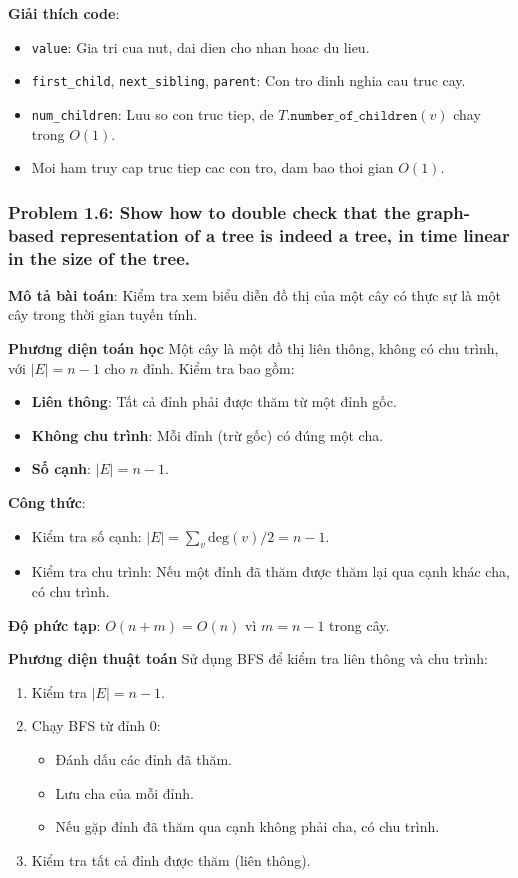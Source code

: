 \documentclass[a4paper,12pt]{article}
\begin{document}
\bigskip
\textbf{Giải thích code}:
\begin{itemize}
    \item \texttt{value}: Gia tri cua nut, dai dien cho nhan hoac du lieu.
    \item \texttt{first\_child}, \texttt{next\_sibling}, \texttt{parent}: Con tro dinh nghia cau truc cay.
    \item \texttt{num\_children}: Luu so con truc tiep, de \(T.\texttt{number\_of\_children}(v)\) chay trong \(O(1)\).
    \item Moi ham truy cap truc tiep cac con tro, dam bao thoi gian \(O(1)\).
\end{itemize}


\subsubsection{Problem 1.6: Show how to double check that the graph-based representation of a tree is indeed a tree, in time linear in the size of the tree.}
\textbf{Mô tả bài toán}: Kiểm tra xem biểu diễn đồ thị của một cây có thực sự là một cây trong thời gian tuyến tính.

\textbf{Phương diện toán học}
Một cây là một đồ thị liên thông, không có chu trình, với \( |E| = n-1 \) cho \( n \) đỉnh. Kiểm tra bao gồm:
\begin{itemize}
    \item \textbf{Liên thông}: Tất cả đỉnh phải được thăm từ một đỉnh gốc.
    \item \textbf{Không chu trình}: Mỗi đỉnh (trừ gốc) có đúng một cha.
    \item \textbf{Số cạnh}: \( |E| = n-1 \).
\end{itemize}

\textbf{Công thức}:
\begin{itemize}
    \item Kiểm tra số cạnh: \( |E| = \sum_{v} \text{deg}(v) / 2 = n-1 \).
    \item Kiểm tra chu trình: Nếu một đỉnh đã thăm được thăm lại qua cạnh khác cha, có chu trình.
\end{itemize}

\textbf{Độ phức tạp}: \( O(n + m) = O(n) \) vì \( m = n-1 \) trong cây.

\textbf{Phương diện thuật toán}
Sử dụng BFS để kiểm tra liên thông và chu trình:
\begin{enumerate}
    \item Kiểm tra \( |E| = n-1 \).
    \item Chạy BFS từ đỉnh 0:
        \begin{itemize}
            \item Đánh dấu các đỉnh đã thăm.
            \item Lưu cha của mỗi đỉnh.
            \item Nếu gặp đỉnh đã thăm qua cạnh không phải cha, có chu trình.
        \end{itemize}
    \item Kiểm tra tất cả đỉnh được thăm (liên thông).
\end{enumerate}
\end{document}
